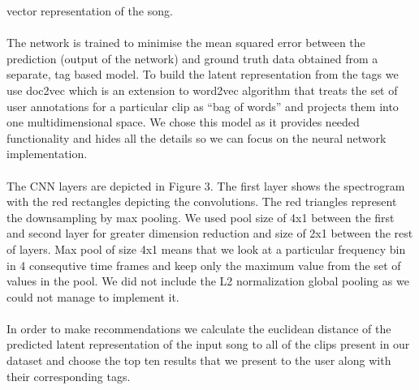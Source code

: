 \documentclass[11pt, a4paper]{article}
\begin{document}
    vector representation of the song.
    \\ \\
    \noindent
    The network is trained to minimise the mean squared error between the
    prediction (output of the network) and ground truth data obtained from
    a separate, tag based model. To build the latent representation from the
    tags we use doc2vec which is an extension to word2vec algorithm that treats
    the set of user annotations for a particular clip as ``bag of words'' and 
    projects them into one multidimensional space. We chose this model as it
    provides needed functionality and hides all the details so we can focus
    on the neural network implementation.
    \\ \\
    \noindent
    The CNN layers are depicted in Figure 3. The first layer shows the
    spectrogram with the red rectangles depicting the convolutions. The red
    triangles represent the downsampling by max pooling. We used pool size
    of 4x1 between the first and second layer for greater dimension reduction
    and size of 2x1 between the rest of layers. Max pool of size 4x1 means that
    we look at a particular frequency bin in 4 consequtive time frames and keep
    only the maximum value from the set of values in the pool. We did not
    include the L2 normalization global pooling as we could not manage to
    implement it.
    \\ \\
    \noindent
    In order to make recommendations we calculate the euclidean distance of the
    predicted latent representation of the input song to all of the clips
    present in our dataset and choose the top ten results that we present to
    the user along with their corresponding tags.
\end{document}
